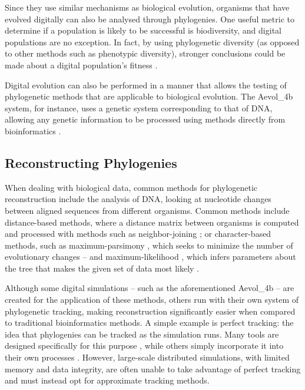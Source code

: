 Since they use similar mechanisms as biological evolution, organisms that have evolved digitally can also be analysed through phylogenies. One useful metric to determine if a population is likely to be successful is biodiversity, and digital populations are no exception. In fact, by using phylogenetic diversity (as opposed to other methods such as phenotypic diversity), stronger conclusions could be made about a digital population's fitness \citep{hernandez2022phylogenetic}.

Digital evolution can also be performed in a manner that allows the testing of phylogenetic methods that are applicable to biological evolution. The Aevol\_4b system, for instance, uses a genetic system corresponding to that of DNA, allowing any genetic information to be processed using methods directly from bioinformatics \citep{daudey2024aevol}.

\subsection{Reconstructing Phylogenies} \label{sec:introduction:reconst}

When dealing with biological data, common methods for phylogenetic reconstruction include the analysis of DNA, looking at nucleotide changes between aligned sequences from different organisms. Common methods include distance-based methods, where a distance matrix between organisms is computed and processed with methods such as neighbor-joining \citep{saitou1987neighbor}; or character-based methods, such as maximum-parsimony \citep{sober1991reconstructing}, which seeks to minimize the number of evolutionary changes -- and maximum-likelihood \citep{felsenstein1981evolutionary}, which infers parameters about the tree that makes the given set of data most likely \citep{de2014phylogenetic}.

Although some digital simulations -- such as the aforementioned Aevol\_4b -- are created for the application of these methods, others run with their own system of phylogenetic tracking, making reconstruction significantly easier when compared to traditional bioinformatics methods. A simple example is perfect tracking: the idea that phylogenies can be tracked as the simulation runs. Many tools are designed specifically for this purpose \citep{dolson2024phylotrack}, while others simply incorporate it into their own processes \citep{bohm2017mabe}. However, large-scale distributed simulations, with limited memory and data integrity, are often unable to take advantage of perfect tracking and must instead opt for approximate tracking methods.

